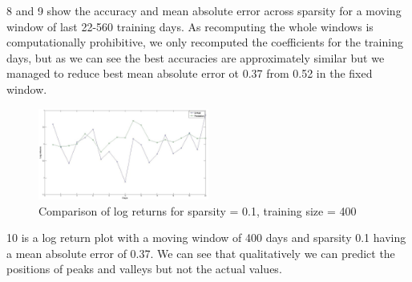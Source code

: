 \figurename{8} and \figurename{9} show the accuracy and mean absolute error across sparsity for a moving window of last 22-560 training days. As recomputing the whole windows is computationally prohibitive, we only recomputed the coefficients for the training days, but as we can see the best accuracies are approximately similar but we managed to reduce best mean absolute error ot 0.37 from 0.52 in the fixed window.

\begin{figure}[h!]
	\includegraphics[width=0.5\textwidth]{results/prediction.jpg}
	\caption{Comparison of log returns for sparsity = 0.1, training size = 400}
\end{figure}

\figurename{10} is a log return plot with a moving window of 400 days and sparsity 0.1 having a mean absolute error of 0.37. We can see that qualitatively we can predict the positions of peaks and valleys but not the actual values.



